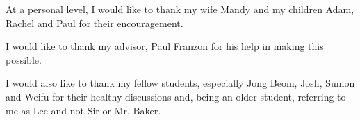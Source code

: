 \begin{acknowledgements}
At a personal level, I would like to thank my wife Mandy and my children Adam, Rachel and Paul for their encouragement.

I would like to thank my advisor, Paul Franzon for his help in making this possible.

I would also like to thank my fellow students, especially Jong Beom, Josh, Sumon and Weifu for their healthy discussions and, being an older student, referring to me as Lee and not Sir or Mr. Baker.

\end{acknowledgements}


\iftrue

\thesistableofcontents

\thesislistoftables

\thesislistoffigures

\fi
